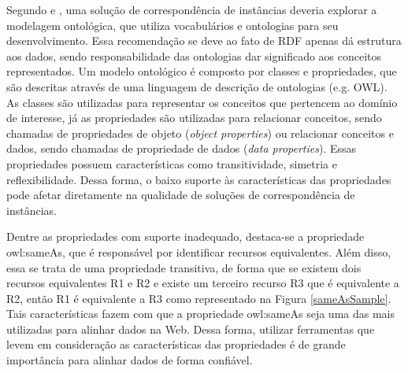 
Segundo \cite{homoceanu2014putting} e \cite{ferrara2008towards}, uma solução de correspondência de instâncias deveria explorar a modelagem ontológica, que utiliza vocabulários e ontologias para seu desenvolvimento. Essa recomendação se deve ao fato de RDF apenas dá estrutura aos dados, sendo responsabilidade das ontologias dar significado aos conceitos representados. Um modelo ontológico é composto por classes e propriedades, que são descritas através de uma linguagem de descrição de ontologias (e.g. OWL). As classes são utilizadas para representar os conceitos que pertencem ao domínio de interesse, já as propriedades são utilizadas para relacionar conceitos, sendo chamadas de propriedades de objeto (\textit{object properties}) ou relacionar conceitos e dados, sendo chamadas de propriedade de dados (\textit{data properties}). Essas propriedades possuem características como transitividade, simetria e reflexibilidade. Dessa forma, o baixo suporte às características das propriedades pode afetar diretamente na qualidade de soluções de correspondência de instâncias. 
        
Dentre as propriedades com suporte inadequado,  destaca-se a propriedade owl:sameAs, que é responsável por identificar recursos equivalentes. Além disso, essa se trata de uma propriedade transitiva, de forma que se existem dois recursos equivalentes R1 e R2 e existe um terceiro recurso R3 que é equivalente a R2, então R1 é equivalente a R3 como representado na Figura \ref{sameAsSample}. Tais características fazem com que a propriedade owl:sameAs seja uma das  mais utilizadas para alinhar dados na Web. Dessa forma, utilizar ferramentas que levem em consideração as características das propriedades é de grande importância para alinhar dados de forma confiável.


